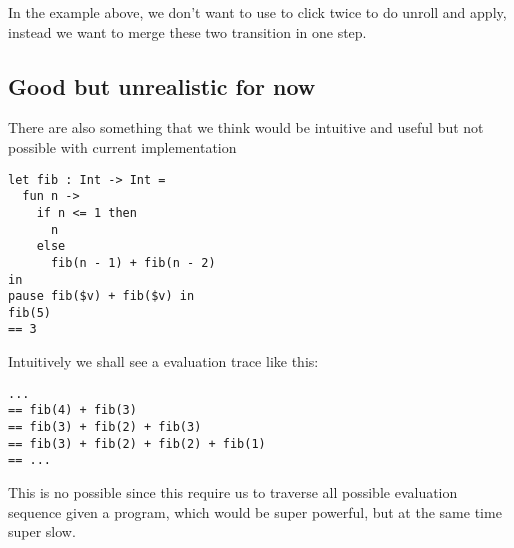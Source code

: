 In the example above, we don't want to use to click twice to do unroll and apply, instead we want to merge these two transition
in one step.

\subsection{Good but unrealistic for now}


There are also something that we think would be intuitive and useful but not possible with current implementation

\begin{verbatim}
let fib : Int -> Int =
  fun n ->
    if n <= 1 then
      n
    else
      fib(n - 1) + fib(n - 2)
in
pause fib($v) + fib($v) in
fib(5)
== 3
\end{verbatim}

Intuitively we shall see a evaluation trace like this:
\begin{verbatim}
...
== fib(4) + fib(3)
== fib(3) + fib(2) + fib(3)
== fib(3) + fib(2) + fib(2) + fib(1)
== ...
\end{verbatim}

This is no possible since this require us to traverse all possible
evaluation sequence given a program, which would be super powerful,
but at the same time super slow.

